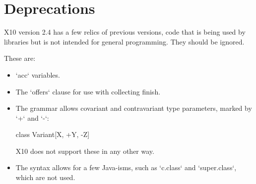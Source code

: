 \chapter{Deprecations}

X10 version 2.4 has a few relics of previous versions, code that is being used
by libraries but is not intended for general programming.    They should be
ignored.

These are: 

\begin{itemize}

\item \xcd`acc` variables. 

\item The \xcd`offers` clause for use with collecting finish.

\item The grammar allows covariant and contravariant type parameters, marked
      by \xcd`+` and \xcd`-`: 
\begin{xtenmath}
class Variant[X, +Y, -Z] {}
\end{xtenmath}
      X10 does not support these in any other way.  

\item The syntax allows for a few Java-isms, such as \xcd`c.class` and
      \xcd`super.class`, which are not used.

\end{itemize}
